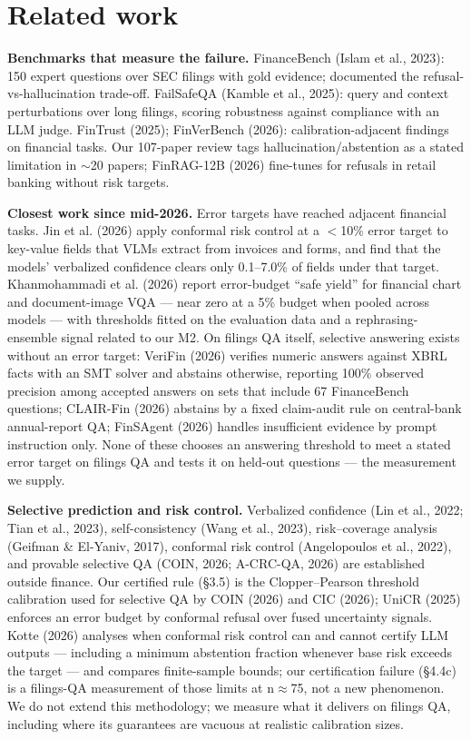 \documentclass[11pt]{article}
\begin{document}
\section{Related work}

\textbf{Benchmarks that measure the failure.} FinanceBench (Islam et al., 2023): 150 expert questions over SEC filings with gold evidence; documented the refusal-vs-hallucination trade-off. FailSafeQA (Kamble et al., 2025): query and context perturbations over long filings, scoring robustness against compliance with an LLM judge. FinTrust (2025); FinVerBench (2026): calibration-adjacent findings on financial tasks. Our 107-paper review tags hallucination/abstention as a stated limitation in $\sim$20 papers; FinRAG-12B (2026) fine-tunes for refusals in retail banking without risk targets.

\textbf{Closest work since mid-2026.} Error targets have reached adjacent financial tasks. Jin et al. (2026) apply conformal risk control at a $<$10\% error target to key-value fields that VLMs extract from invoices and forms, and find that the models' verbalized confidence clears only 0.1--7.0\% of fields under that target. Khanmohammadi et al. (2026) report error-budget ``safe yield'' for financial chart and document-image VQA --- near zero at a 5\% budget when pooled across models --- with thresholds fitted on the evaluation data and a rephrasing-ensemble signal related to our M2. On filings QA itself, selective answering exists without an error target: VeriFin (2026) verifies numeric answers against XBRL facts with an SMT solver and abstains otherwise, reporting 100\% observed precision among accepted answers on sets that include 67 FinanceBench questions; CLAIR-Fin (2026) abstains by a fixed claim-audit rule on central-bank annual-report QA; FinSAgent (2026) handles insufficient evidence by prompt instruction only. None of these chooses an answering threshold to meet a stated error target on filings QA and tests it on held-out questions --- the measurement we supply.

\textbf{Selective prediction and risk control.} Verbalized confidence (Lin et al., 2022; Tian et al., 2023), self-consistency (Wang et al., 2023), risk--coverage analysis (Geifman \& El-Yaniv, 2017), conformal risk control (Angelopoulos et al., 2022), and provable selective QA (COIN, 2026; A-CRC-QA, 2026) are established outside finance. Our certified rule (\S{}3.5) is the Clopper--Pearson threshold calibration used for selective QA by COIN (2026) and CIC (2026); UniCR (2025) enforces an error budget by conformal refusal over fused uncertainty signals. Kotte (2026) analyses when conformal risk control can and cannot certify LLM outputs --- including a minimum abstention fraction whenever base risk exceeds the target --- and compares finite-sample bounds; our certification failure (\S{}4.4c) is a filings-QA measurement of those limits at n$\approx$75, not a new phenomenon. We do not extend this methodology; we measure what it delivers on filings QA, including where its guarantees are vacuous at realistic calibration sizes.
\end{document}
